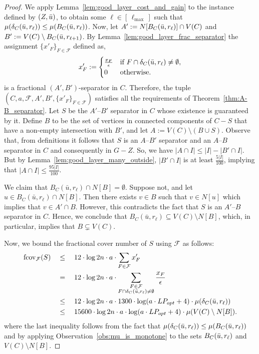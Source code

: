 \documentclass[11pt]{amsart}
\newcommand{\lpopt}{LP_{opt}}
\begin{document}
\begin{proof}
    We apply Lemma~\ref{lem:good_layer_cost_and_gain} to the instance defined by $(Z, \Bar{u})$, to obtain some $\ell \in [\,\ell_{\max}\,]$ such that $\mu(\delta_C(\Bar{u}, r_\ell)) \leq \mu(B_C(\Bar{u}, r_\ell))$. Now, let $A' := N[B_C(\Bar{u}, r_\ell)]\cap V(C)$ and $B' := V(C) \setminus B_C(\Bar{u}, r_{\ell+1})$. By Lemma~\ref{lem:good_layer_frac_separator} the assignment $\{x'_F\}_{F \in \mathcal{F}}$ defined as,
    $$
    x'_F :=
    \begin{cases}
    \frac{x_F}{\epsilon} & \text{if } F \cap \delta_C(\Bar{u}, r_\ell) \neq \emptyset, \\
    0 & \text{otherwise.}
    \end{cases}
    $$
    is a fractional $(A',B')$-separator in $C$. Therefore, the tuple $(C, a, \mathcal{F}, A', B', \{x'_F\}_{F \in \mathcal{F}})$ satisfies all the requirements of Theorem~\ref{thm:A-B_separator}. Let $S$ be the $A'$--$B'$ separator in $C$ whose existence is guaranteed by it. Define $B$ to be the set of vertices in connected components of $C - S$ that have a non-empty intersection with $B'$, and let $A := V(C) \setminus (B \cup S)$. Observe that, from definitions it follows that $S$ is an $A$--$B'$ separator and an $A$--$B$ separator in $C$ and consequently in $G-Z$. So, we have $|A \cap I| \leq |I| - |B' \cap I|$. But by Lemma~\ref{lem:good_layer_many_outside}, $|B' \cap I|$ is at least $\frac{5|I|}{100}$, implying that $|A \cap I| \leq \frac{95|I|}{100}$. 
    
    We claim that $B_C(\bar{u}, r_\ell) \cap N[B] = \emptyset$. Suppose not, and let $u \in B_C(\bar{u}, r_\ell) \cap N[B]$. Then there exists $v \in B$ such that $v \in N[u]$ which implies that $v \in A' \cap B$. However, this contradicts the fact that $S$ is an $A'$--$B$ separator in $C$. Hence, we conclude that $B_C(\bar{u}, r_\ell) \subseteq V(C) \setminus N[B]$, which, in particular, implies that $B \subsetneq V(C)$.
    
    Now, we bound the fractional cover number of $S$ using $\mathcal{F}$ as follows:
    \begin{align*}
        \mathrm{fcov}_{\mathcal{F}}(S) \quad
        &\leq \quad 12 \cdot \log 2n \cdot a \cdot \sum_{F \in \mathcal{F}} x'_F \\
        &= \quad 12 \cdot \log 2n \cdot a \cdot \sum_{\substack{F \in \mathcal{F} \\ F \cap \delta_C(\Bar{u}, r_\ell) \neq \emptyset}} \frac{x_F}{\epsilon} \\
        &\leq \quad 12 \cdot \log 2n \cdot a \cdot 1300 \cdot \log(a \cdot \lpopt + 4) \cdot \mu(\delta_C(\Bar{u}, r_\ell)) \\
        &\leq \quad 15600 \cdot \log 2n \cdot a \cdot \log(a \cdot \lpopt + 4) \cdot \mu(V(C)\setminus N[B]).
    \end{align*}
    where the last inequality follows from the fact that $\mu(\delta_C(\Bar{u}, r_\ell)) \leq \mu(B_C(\Bar{u}, r_\ell))$ and by applying Observation~\ref{obs:mu_is_monotone} to the sets $B_C(\Bar{u}, r_\ell)$ and $V(C) \setminus N[B]$.

\end{proof}
\end{document}
